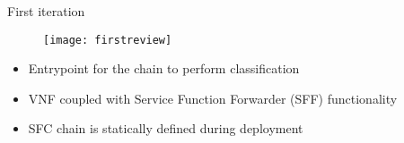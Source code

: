\begin{frame}{First iteration}

  \vspace{-0.5cm}

  \begin{figure}
    \centering
    \texttt{[image: firstreview]}
  \end{figure}

  \vspace{0.2cm}

  \begin{itemize}
    \item Entrypoint for the chain to perform classification
    \item VNF coupled with Service Function Forwarder (SFF) functionality
    \item SFC chain is statically defined during deployment
  \end{itemize}

\end{frame}